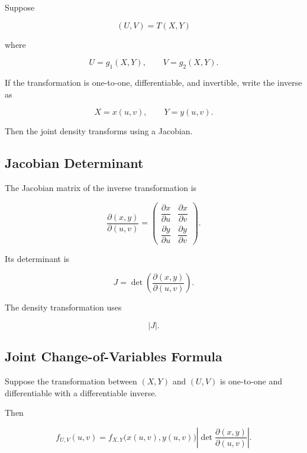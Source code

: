 Suppose

\[
(U,V)
=
T(X,Y)
\]

where

\[
U=g_1(X,Y),
\qquad
V=g_2(X,Y).
\]

If the transformation is one-to-one, differentiable, and invertible,
write the inverse as

\[
X=x(u,v),
\qquad
Y=y(u,v).
\]

Then the joint density transforms using a Jacobian.

\subsection{Jacobian Determinant}
\label{subsec:jacobian-determinant-probability}

The Jacobian matrix of the inverse transformation is

\[
\frac{\partial(x,y)}{\partial(u,v)}
=
\begin{pmatrix}
\dfrac{\partial x}{\partial u}
&
\dfrac{\partial x}{\partial v}
\\[3mm]
\dfrac{\partial y}{\partial u}
&
\dfrac{\partial y}{\partial v}
\end{pmatrix}.
\]

Its determinant is

\[
\boxed{
J
=
\det
\left(
\frac{\partial(x,y)}{\partial(u,v)}
\right).
}
\]

The density transformation uses

\[
|J|.
\]

\subsection{Joint Change-of-Variables Formula}
\label{subsec:joint-change-of-variables}

\begin{theorem}
Suppose the transformation between \((X,Y)\) and \((U,V)\) is
one-to-one and differentiable with a differentiable inverse.

Then

\[
\boxed{
f_{U,V}(u,v)
=
f_{X,Y}
\bigl(
x(u,v),
y(u,v)
\bigr)
\left|
\det
\frac{\partial(x,y)}{\partial(u,v)}
\right|.
}
\]
\end{theorem}

